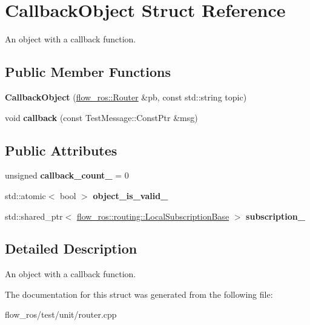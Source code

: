 \hypertarget{struct_callback_object}{}\section{Callback\+Object Struct Reference}
\label{struct_callback_object}


An object with a callback function.  


\subsection*{Public Member Functions}
\begin{DoxyCompactItemize}
\item 
\mbox{\label{struct_callback_object_a9327a3aec06b1c8f9ca559add605f5a0}} 
{\bfseries Callback\+Object} (\hyperlink{classflow__ros_1_1_router}{flow\+\_\+ros\+::\+Router} \&pb, const std\+::string topic)
\item 
\mbox{\label{struct_callback_object_a031da903eed80f592a5663620c4dec07}} 
void {\bfseries callback} (const Test\+Message\+::\+Const\+Ptr \&msg)
\end{DoxyCompactItemize}
\subsection*{Public Attributes}
\begin{DoxyCompactItemize}
\item 
\mbox{\label{struct_callback_object_a19f964fd901e45bda4611f15676f003c}} 
unsigned {\bfseries callback\+\_\+count\+\_\+} = 0
\item 
\mbox{\label{struct_callback_object_af94b40a2c82d4d4e4bd43beb7d3a87ef}} 
std\+::atomic$<$ bool $>$ {\bfseries object\+\_\+is\+\_\+valid\+\_\+}
\item 
\mbox{\label{struct_callback_object_aaae0ab0887611b5b1170e7a53b57a2d3}} 
std\+::shared\+\_\+ptr$<$ \hyperlink{classflow__ros_1_1routing_1_1_local_subscription_base}{flow\+\_\+ros\+::routing\+::\+Local\+Subscription\+Base} $>$ {\bfseries subscription\+\_\+}
\end{DoxyCompactItemize}


\subsection{Detailed Description}
An object with a callback function. 

The documentation for this struct was generated from the following file\+:\begin{DoxyCompactItemize}
\item 
flow\+\_\+ros/test/unit/router.\+cpp\end{DoxyCompactItemize}
